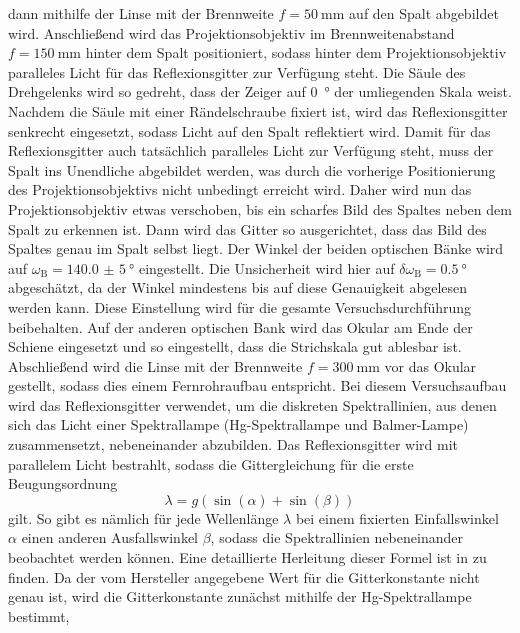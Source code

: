 dann mithilfe der Linse mit der Brennweite $f = \SI{50}{\milli \meter}$ auf den Spalt abgebildet wird. Anschließend wird das Projektionsobjektiv im Brennweitenabstand
$f = \SI{150}{\milli \meter}$ hinter dem Spalt positioniert, sodass hinter dem Projektionsobjektiv paralleles Licht für das Reflexionsgitter zur Verfügung steht.
Die Säule des Drehgelenks wird so gedreht, dass der Zeiger auf \SI{0}{\degree} der umliegenden Skala weist. Nachdem die Säule mit einer Rändelschraube fixiert ist,
wird das Reflexionsgitter senkrecht  eingesetzt, sodass Licht auf den Spalt reflektiert wird. Damit für das Reflexionsgitter auch tatsächlich paralleles Licht
zur Verfügung steht, muss der Spalt ins Unendliche abgebildet werden, was durch die vorherige Positionierung des Projektionsobjektivs nicht unbedingt erreicht wird.
Daher wird nun das Projektionsobjektiv etwas verschoben, bis ein scharfes Bild des Spaltes neben dem Spalt zu erkennen ist. Dann wird das Gitter so ausgerichtet,
dass das Bild des Spaltes genau im Spalt selbst liegt. Der Winkel der beiden optischen Bänke wird auf $\omega_{\mathrm{B}} = \SI{140,0(5)}{\degree}$ eingestellt.
Die Unsicherheit wird hier auf $\delta \omega_{\mathrm{B}} = \SI{0,5}{\degree}$ abgeschätzt, da der Winkel mindestens bis auf diese Genauigkeit abgelesen werden kann.
Diese Einstellung wird für die gesamte Versuchsdurchführung beibehalten.
Auf der anderen optischen Bank wird das Okular am Ende der Schiene eingesetzt und so eingestellt, dass die Strichskala gut ablesbar ist. Abschließend wird die Linse
mit der Brennweite $f = \SI{300}{\milli \meter}$ vor das Okular gestellt, sodass dies einem Fernrohraufbau entspricht. Bei diesem Versuchsaufbau wird das Reflexionsgitter
verwendet, um die diskreten Spektrallinien, aus denen sich das Licht einer Spektrallampe (Hg-Spektrallampe und Balmer-Lampe) zusammensetzt, nebeneinander abzubilden.
Das Reflexionsgitter wird mit parallelem Licht bestrahlt, sodass die Gittergleichung für die erste Beugungsordnung
\begin{equation}\label{eq:gittergleichung}
    \lambda = g (\sin(\alpha) + \sin(\beta))
\end{equation} gilt. So gibt es nämlich für jede Wellenlänge $\lambda$ bei einem fixierten Einfallswinkel $\alpha$ einen anderen Ausfallswinkel $\beta$, sodass die Spektrallinien
nebeneinander beobachtet werden können. Eine detaillierte Herleitung dieser Formel ist in \cite{balmer_handblatt} zu finden.\newline
\indent Da der vom Hersteller angegebene Wert für die Gitterkonstante nicht genau ist, wird die Gitterkonstante zunächst mithilfe der Hg-Spektrallampe bestimmt,
